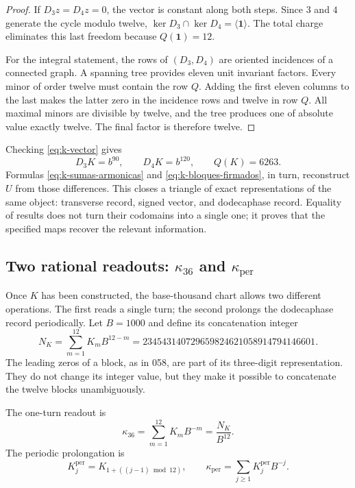 \begin{proof}
If \(D_3z=D_4z=0\), the vector is constant along both steps.
Since \(3\) and \(4\) generate the cycle modulo twelve,
\(\ker D_3\cap\ker D_4=\langle\mathbf1\rangle\). The total charge
eliminates this last freedom because \(Q(\mathbf1)=12\).

For the integral statement, the rows of \((D_3,D_4)\) are oriented incidences
of a connected graph. A spanning tree provides eleven
unit invariant factors. Every minor of order twelve must contain the
row \(Q\). Adding the first eleven columns to the last makes the latter
zero in the incidence rows and twelve in row \(Q\). All
maximal minors are divisible by twelve, and the tree produces one
of absolute value exactly twelve. The final factor is therefore twelve.
\end{proof}

Checking \eqref{eq:k-vector} gives
\[
 D_3K=b^{90},\qquad D_4K=b^{120},\qquad Q(K)=6263.
\]
Formulas \eqref{eq:k-sumas-armonicas} and
\eqref{eq:k-bloques-firmados}, in turn, reconstruct \(U\) from those
differences. This closes a triangle of exact representations of the
same object: transverse record, signed vector, and dodecaphase record. Equality
of results does not turn their codomains into a single one; it proves that
the specified maps recover the relevant information.



\subsection{Two rational readouts: \texorpdfstring{\(\kappa_{36}\)}{kappa36} and \texorpdfstring{\(\kappa_{\mathrm{per}}\)}{periodic kappa}}
\label{subsec:k-kappas}

Once \(K\) has been constructed, the base-thousand chart allows two different
operations. The first reads a single turn; the second prolongs the dodecaphase record
periodically. Let \(B=1000\) and define its concatenation integer
\begin{equation}
 N_K=\sum_{m=1}^{12}K_mB^{12-m}
 =234543140729659824621058914794146601.
 \label{eq:k-numerador}
\end{equation}
The leading zeros of a block, as in 058, are part of its three-digit
representation. They do not change its integer value, but they make it possible to concatenate
the twelve blocks unambiguously.

\begin{definition}
\label{def:k-kappas}
The one-turn readout is
\[
 \kappa_{36}=\sum_{m=1}^{12}K_mB^{-m}=\frac{N_K}{B^{12}}.
\]
The periodic prolongation is
\[
 K_j^{\mathrm{per}}=K_{1+((j-1)\bmod12)},\qquad
 \kappa_{\mathrm{per}}=\sum_{j\geq1}K_j^{\mathrm{per}}B^{-j}.
\]
\end{definition}

